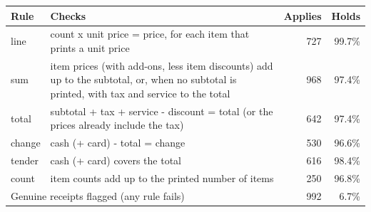 \begin{tabular}{llrr}
\toprule
Rule & Checks & Applies & Holds\\
\midrule
line & count x unit price = price, for each item that prints a unit price & 727 & 99.7\%\\
sum & item prices (with add-ons, less item discounts) add up to the subtotal, or, when no subtotal is printed, with tax and service to the total & 968 & 97.4\%\\
total & subtotal + tax + service - discount = total (or the prices already include the tax) & 642 & 97.4\%\\
change & cash (+ card) - total = change & 530 & 96.6\%\\
tender & cash (+ card) covers the total & 616 & 98.4\%\\
count & item counts add up to the printed number of items & 250 & 96.8\%\\
\midrule
\multicolumn{2}{l}{Genuine receipts flagged (any rule fails)} & 992 & 6.7\%\\
\bottomrule
\end{tabular}
